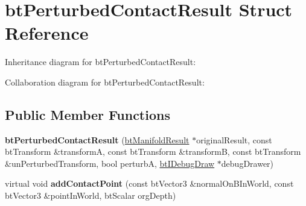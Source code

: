 \hypertarget{structbt_perturbed_contact_result}{\section{bt\+Perturbed\+Contact\+Result Struct Reference}
\label{structbt_perturbed_contact_result}
}


Inheritance diagram for bt\+Perturbed\+Contact\+Result\+:


Collaboration diagram for bt\+Perturbed\+Contact\+Result\+:
\subsection*{Public Member Functions}
\begin{DoxyCompactItemize}
\item 
\hypertarget{structbt_perturbed_contact_result_a9a34b4e9a4f00e6af7f77de8302688f7}{{\bfseries bt\+Perturbed\+Contact\+Result} (\hyperlink{classbt_manifold_result}{bt\+Manifold\+Result} $\ast$original\+Result, const bt\+Transform \&transform\+A, const bt\+Transform \&transform\+B, const bt\+Transform \&un\+Perturbed\+Transform, bool perturb\+A, \hyperlink{classbt_i_debug_draw}{bt\+I\+Debug\+Draw} $\ast$debug\+Drawer)}\label{structbt_perturbed_contact_result_a9a34b4e9a4f00e6af7f77de8302688f7}

\item 
\hypertarget{structbt_perturbed_contact_result_a8e84543c981ef96eccc133d78e1e04f2}{virtual void {\bfseries add\+Contact\+Point} (const bt\+Vector3 \&normal\+On\+B\+In\+World, const bt\+Vector3 \&point\+In\+World, bt\+Scalar org\+Depth)}\label{structbt_perturbed_contact_result_a8e84543c981ef96eccc133d78e1e04f2}

\end{DoxyCompactItemize}
